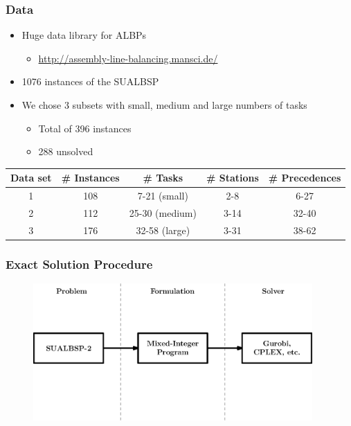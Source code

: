 \documentclass{beamer}
\begin{document}
\begin{frame}
\frametitle{Data}
\begin{itemize}
	\item Huge data library for ALBPs\vspace{1mm}
	\begin{itemize}
		\item \url{http://assembly-line-balancing.mansci.de/}\vspace{3mm}
	\end{itemize}
	\item 1076 instances of the SUALBSP\vspace{3mm}\pause
	\item We chose 3 subsets with small, medium and large numbers of tasks \vspace{3mm}
	\begin{itemize}
		\item Total of 396 instances\vspace{2mm}\pause
		\item {\color{red} 288 unsolved}\pause
	\end{itemize}
\end{itemize}
\begin{table}
	\centering
	\begin{tabular}{ccccc}
		\toprule
		Data set & \# Instances  & \# Tasks & \# Stations & \# Precedences \\\midrule\midrule
		1 & 108 & 7-21 (small) & 2-8 & 6-27 \\
		2 & 112 & 25-30 (medium) & 3-14 & 32-40 \\
		3 & 176 & 32-58 (large) & 3-31 & 38-62 \\
		\bottomrule
	\end{tabular}
\end{table}
\end{frame}

\begin{frame}
\frametitle{Exact Solution Procedure}
\begin{figure}
	\centering
	\includegraphics[width=0.95\textwidth]{images/mipApproach.eps}
\end{figure}
\end{frame}
\end{document}
